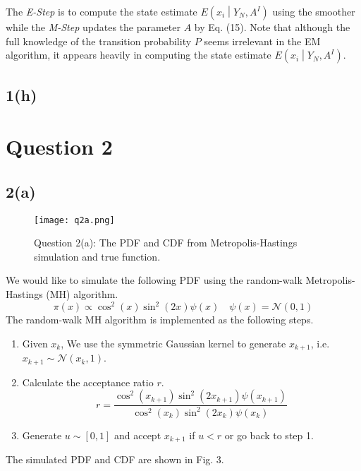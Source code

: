 \documentclass[a4paper, 11pt]{article}
\begin{document}
The \textit{E-Step} is to compute the state estimate $E\left(x_i\middle| Y_N, A^I \right)$ using the smoother while the \textit{M-Step} updates the parameter $A$ by Eq. (15). Note that although the full knowledge of the transition probability $P$ seems irrelevant in the EM algorithm, it appears heavily in computing the state estimate $E\left(x_i\middle| Y_N, A^I \right)$.


\subsection*{1(h)}








\section*{Question 2}
\subsection*{2(a)}


\begin{figure}
	\begin{center}
		\texttt{[image: q2a.png]}
		\caption{Question 2(a): The PDF and CDF from Metropolis-Hastings simulation and true function. }
	\end{center}
\end{figure}

We would like to simulate the following PDF using the random-walk Metropolis-Hastings (MH) algorithm. 
\begin{equation}
\pi(x) \propto \cos^2(x)\sin^2(2x)\psi(x) \quad \psi(x) = \mathcal{N}(0,1)
\end{equation}
The random-walk MH algorithm is implemented as the following steps. 
\begin{enumerate}
\item Given $x_k$, We use the symmetric Gaussian kernel to generate $x_{k+1}$, i.e. $x_{k+1}\sim\mathcal{N}(x_k, 1)$. 
\item Calculate the acceptance ratio $r$. 
\begin{equation}
r = \frac{\cos^2(x_{k+1})\sin^2(2x_{k+1})\psi(x_{k+1})}{\cos^2(x_k)\sin^2(2x_k)\psi(x_k)}
\end{equation}
\item Generate $u\sim [0,1]$ and accept $x_{k+1}$ if $u < r$ or go back to step 1. 
\end{enumerate}
The simulated PDF and CDF are shown in Fig. 3. 
\end{document}
